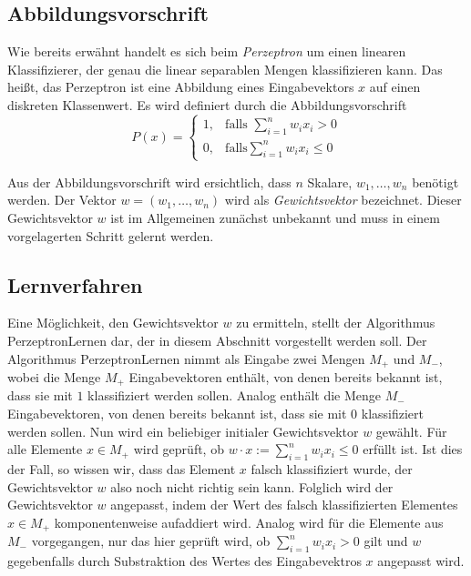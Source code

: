 \documentclass[fontsize=11pt]{scrartcl}
\begin{document}
            \subsection{Abbildungsvorschrift}
                Wie bereits erwähnt handelt es sich beim \emph{Perzeptron} um einen linearen Klassifizierer, der genau die linear separablen Mengen klassifizieren kann. Das heißt, das Perzeptron ist eine Abbildung eines Eingabevektors $x$ auf einen diskreten Klassenwert. Es wird definiert durch die Abbildungsvorschrift
                $$
                    P(x)=\left\{\begin{array}{cl} 1, & \mbox{falls }\sum_{i=1}^nw_ix_i > 0\\ 0, & \mbox{falls} \sum_{i=1}^n w_ix_i \leq 0 \end{array}\right. 
                $$ \cite{ertel2016}

                Aus der Abbildungsvorschrift wird ersichtlich, dass $n$ Skalare, $w_1,\dots,w_n$ benötigt werden. Der Vektor $w = (w_1,\dots, w_n)$ wird als \emph{Gewichtsvektor} bezeichnet. Dieser Gewichtsvektor $w$ ist im Allgemeinen zunächst unbekannt und muss in einem vorgelagerten Schritt gelernt werden.

            \subsection{Lernverfahren}
                Eine Möglichkeit, den Gewichtsvektor $w$ zu ermitteln, stellt der Algorithmus PerzeptronLernen dar, der in diesem Abschnitt vorgestellt werden soll. Der Algorithmus PerzeptronLernen nimmt als Eingabe zwei Mengen $M_+$ und $M_-$, wobei die Menge $M_+$ Eingabevektoren enthält, von denen bereits bekannt ist, dass sie mit $1$ klassifiziert werden sollen. Analog enthält die Menge $M_-$ Eingabevektoren, von denen bereits bekannt ist, dass sie mit $0$ klassifiziert werden sollen.
                \newline
                Nun wird ein beliebiger initialer Gewichtsvektor $w$ gewählt.
                \newline
                Für alle Elemente $x \in M_+$ wird geprüft, ob $w \cdot x := \sum_{i=1}^nw_ix_i \leq 0$ erfüllt ist. Ist dies der Fall, so wissen wir, dass das Element $x$ falsch klassifiziert wurde, der Gewichtsvektor $w$ also noch nicht richtig sein kann. Folglich wird der Gewichtsvektor $w$ angepasst, indem der Wert des falsch klassifizierten Elementes $x \in M_+$ komponentenweise aufaddiert wird.
                \newline
                Analog wird für die Elemente aus $M_-$ vorgegangen, nur das hier geprüft wird, ob $\sum_{i=1}^nw_ix_i > 0$ gilt und $w$ gegebenfalls durch Substraktion des Wertes des Eingabevektros $x$ angepasst wird.
\end{document}
